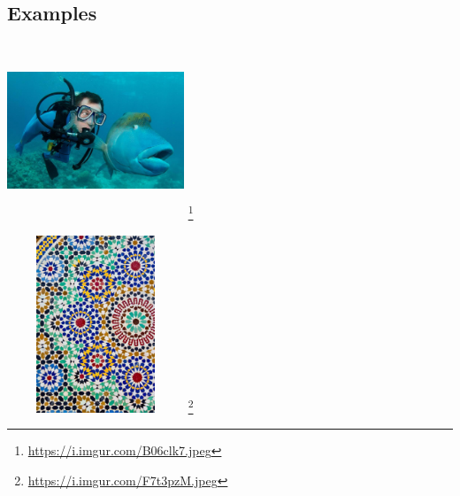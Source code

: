 \clearpage
\subsection{Examples}
\begin{multicols}{2}
    \begin{center}
        \captionsetup{type=figure}
        \includegraphics[width=200px, height=200px]{images/dive.jpeg}
        \footnote{\href{https://i.imgur.com/B06clk7.jpeg}{https://i.imgur.com/B06clk7.jpeg}}
    \end{center}
    \begin{center}
        \captionsetup{type=figure}
        \includegraphics[width=200px, height=200px]{images/mosaic.jpeg}
        \footnote{\href{https://i.imgur.com/F7t3pzM.jpeg}{https://i.imgur.com/F7t3pzM.jpeg}}
    \end{center}
\end{multicols}
